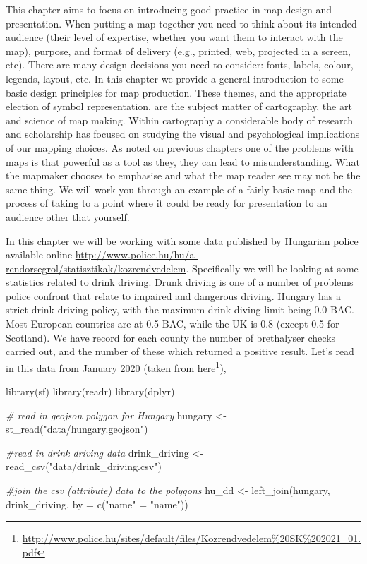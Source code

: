 \documentclass[
]{book}
\makeatletter
\newenvironment{Shaded}{\begin{snugshade}}{\end{snugshade}}
\newcommand{\AttributeTok}[1]{\textcolor[rgb]{0.61,0.61,0.61}{#1}}
\newcommand{\CommentTok}[1]{\textcolor[rgb]{0.37,0.37,0.37}{\textit{#1}}}
\newcommand{\FunctionTok}[1]{\textcolor[rgb]{0,0,0}{#1}}
\newcommand{\NormalTok}[1]{#1}
\newcommand{\OtherTok}[1]{\textcolor[rgb]{0.37,0.37,0.37}{#1}}
\newcommand{\StringTok}[1]{\textcolor[rgb]{0.5,0.5,0.5}{#1}}
\renewcommand{\href}[2]{#2\footnote{\url{#1}}}
\newenvironment{kframe}{%
\medskip{}
\setlength{\fboxsep}{.8em}
 \def\at@end@of@kframe{}%
 \ifinner\ifhmode%
  \def\at@end@of@kframe{\end{minipage}}%
  \begin{minipage}{\columnwidth}%
 \fi\fi%
 \def\FrameCommand##1{\hskip\@totalleftmargin \hskip-\fboxsep
 \colorbox{shadecolor}{##1}\hskip-\fboxsep
     \hskip-\linewidth \hskip-\@totalleftmargin \hskip\columnwidth}%
 \MakeFramed {\advance\hsize-\width
   \@totalleftmargin\z@ \linewidth\hsize
   \@setminipage}}%
 {\par\unskip\endMakeFramed%
 \at@end@of@kframe}
\renewenvironment{Shaded}{\begin{kframe}}{\end{kframe}}
\makeatother
\begin{document}
This chapter aims to focus on introducing good practice in map design and presentation. When putting a map together you need to think about its intended audience (their level of expertise, whether you want them to interact with the map), purpose, and format of delivery (e.g., printed, web, projected in a screen, etc). There are many design decisions you need to consider: fonts, labels, colour, legends, layout, etc. In this chapter we provide a general introduction to some basic design principles for map production. These themes, and the appropriate election of symbol representation, are the subject matter of cartography, the art and science of map making. Within cartography a considerable body of research and scholarship has focused on studying the visual and psychological implications of our mapping choices. As noted on previous chapters one of the problems with maps is that powerful as a tool as they, they can lead to misunderstanding. What the mapmaker chooses to emphasise and what the map reader see may not be the same thing. We will work you through an example of a fairly basic map and the process of taking to a point where it could be ready for presentation to an audience other that yourself.

In this chapter we will be working with some data published by Hungarian police available online \url{http://www.police.hu/hu/a-rendorsegrol/statisztikak/kozrendvedelem}. Specifically we will be looking at some statistics related to drink driving. Drunk driving is one of a number of problems police confront that relate to impaired and dangerous driving. Hungary has a strict drink driving policy, with the maximum drink diving limit being 0.0 BAC. Most European countries are at 0.5 BAC, while the UK is 0.8 (except 0.5 for Scotland). We have record for each county the number of brethalyser checks carried out, and the number of these which returned a positive result. Let's read in this data from January 2020 (taken from \href{http://www.police.hu/sites/default/files/Kozrendvedelem\%20SK\%202021_01.pdf}{here}),

\begin{Shaded}
\begin{Highlighting}[]
\FunctionTok{library}\NormalTok{(sf)}
\FunctionTok{library}\NormalTok{(readr)}
\FunctionTok{library}\NormalTok{(dplyr)}


\CommentTok{\# read in geojson polygon for Hungary}
\NormalTok{hungary }\OtherTok{\textless{}{-}} \FunctionTok{st\_read}\NormalTok{(}\StringTok{"data/hungary.geojson"}\NormalTok{)}

\CommentTok{\#read in drink driving data }
\NormalTok{drink\_driving }\OtherTok{\textless{}{-}} \FunctionTok{read\_csv}\NormalTok{(}\StringTok{"data/drink\_driving.csv"}\NormalTok{)}

\CommentTok{\#join the csv (attribute) data to the polygons}
\NormalTok{hu\_dd }\OtherTok{\textless{}{-}} \FunctionTok{left\_join}\NormalTok{(hungary, drink\_driving, }\AttributeTok{by =} \FunctionTok{c}\NormalTok{(}\StringTok{"name"} \OtherTok{=} \StringTok{"name"}\NormalTok{))}
\end{Highlighting}
\end{Shaded}
\end{document}
